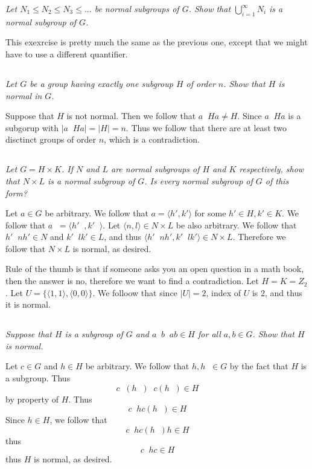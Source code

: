 \documentclass[11pt,oneside,titlepage]{book}
\DeclareMathOperator \inv {^{-1}}
\newcommand{\eangle}[1]{\langle #1 \rangle}
\newcommand{\set}[1]{\{ #1 \}}
\begin{document}
\textit{Let $N_1 \leq N_2 \leq N_3 \leq  ...$ be normal subgroups of $G$. Show that
  $\bigcup_{i = 1}^\infty{N_i}$ is a normal subgroup of $G$.}

This exexrcise is pretty much the same as the previous one, except that
we might have to use a different quantifier.

\subsection{}

\textit{Let $G$ be a group having exactly one subgroup $H$ of order $n$. Show that $H$ is
  normal in $G$.}

Suppose that $H$ is not normal. Then we follow that $a\inv H a \neq H$.
Since $a \inv H a$ is a subgorup with $|a \inv H a| = |H| = n$. Thus we follow that
there are at least two disctinct groups of order $n$, which is a contradiction.

\subsection{}

\textit{Let $G = H \times K$. If $N$ and $L$ are normal subgroups of $H$ and $K$
  respectively, show that $N \times L$ is a normal subgroup of $G$. Is every normal
  subgroup of $G$ of this form?}

Let $a \in G$ be arbitrary.  We follow that $a = \eangle{h', k'}$ for some $h' \in H, k' \in K$.
We follow that $a \inv = \eangle{h'\inv, k'\inv}$. Let $\eangle{n, l} \in N \times L$
be also arbitrary. 
We follow that $h'\inv n h' \in N$ and $k'\inv l k' \in L$, and thus
$\eangle{h'\inv n h', k'\inv l k'} \in N \times L$. Therefore we follow that $N \times L$
is normal, as desired.

Rule of the thumb is that if someone asks you an open question in a math book, then the
answer is no, therefore we want to find a contradiction.
Let $H = K = Z_2$. Let $U = \set{\eangle{1, 1}, \eangle{0, 0}}$. We folloow that since $|U| = 2$,
index of $U$ is $2$, and thus it is normal.

\subsection{}

\textit{Suppose that $H$ is a subgroup of $G$ and $a\inv b\inv a b \in H$ for all $a, b \in G$.
  Show that $H$ is normal.}

Let $c \in G$ and $h \in H$ be arbitrary. We follow that $h, h\inv \in G$ by the
fact that $H$ is a subgroup. Thus
$$c\inv (h\inv) \inv c (h\inv) \in H$$
by property of $H$. Thus
$$c\inv h  c (h\inv) \in H$$
Since $h \in H$, we follow that 
$$c\inv h  c (h\inv) h \in H$$
thus
$$c\inv h  c \in H$$
thus $H$ is normal, as desired.
\end{document}
